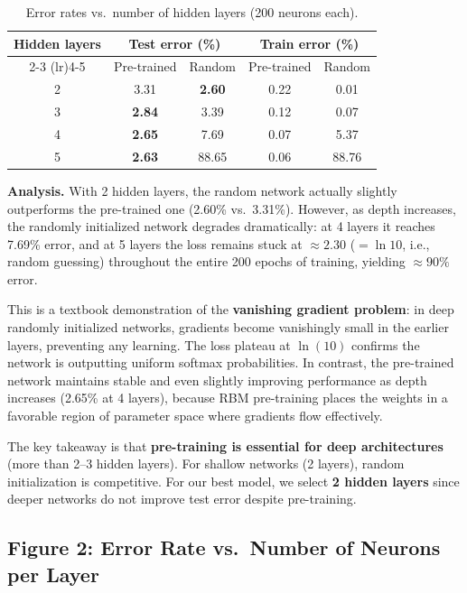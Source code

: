 \documentclass[11pt,a4paper]{article}
\begin{document}
\begin{table}[H]
\centering
\caption{Error rates vs.\ number of hidden layers (200 neurons each).}
\label{tab:fig1}
\begin{tabular}{ccccc}
\toprule
Hidden layers & \multicolumn{2}{c}{Test error (\%)} & \multicolumn{2}{c}{Train error (\%)} \\
\cmidrule(lr){2-3} \cmidrule(lr){4-5}
 & Pre-trained & Random & Pre-trained & Random \\
\midrule
2 & 3.31 & \textbf{2.60} & 0.22 & 0.01 \\
3 & \textbf{2.84} & 3.39 & 0.12 & 0.07 \\
4 & \textbf{2.65} & 7.69 & 0.07 & 5.37 \\
5 & \textbf{2.63} & 88.65 & 0.06 & 88.76 \\
\bottomrule
\end{tabular}
\end{table}

\textbf{Analysis.} With 2 hidden layers, the random network actually slightly outperforms the pre-trained one (2.60\% vs.\ 3.31\%). However, as depth increases, the randomly initialized network degrades dramatically: at 4 layers it reaches 7.69\% error, and at 5 layers the loss remains stuck at $\approx 2.30$ ($= \ln 10$, i.e., random guessing) throughout the entire 200 epochs of training, yielding $\approx 90\%$ error.

This is a textbook demonstration of the \textbf{vanishing gradient problem}: in deep randomly initialized networks, gradients become vanishingly small in the earlier layers, preventing any learning. The loss plateau at $\ln(10)$ confirms the network is outputting uniform softmax probabilities. In contrast, the pre-trained network maintains stable and even slightly improving performance as depth increases (2.65\% at 4 layers), because RBM pre-training places the weights in a favorable region of parameter space where gradients flow effectively.

The key takeaway is that \textbf{pre-training is essential for deep architectures} (more than 2--3 hidden layers). For shallow networks (2 layers), random initialization is competitive. For our best model, we select \textbf{2 hidden layers} since deeper networks do not improve test error despite pre-training.

\subsection{Figure 2: Error Rate vs.\ Number of Neurons per Layer}
\end{document}
